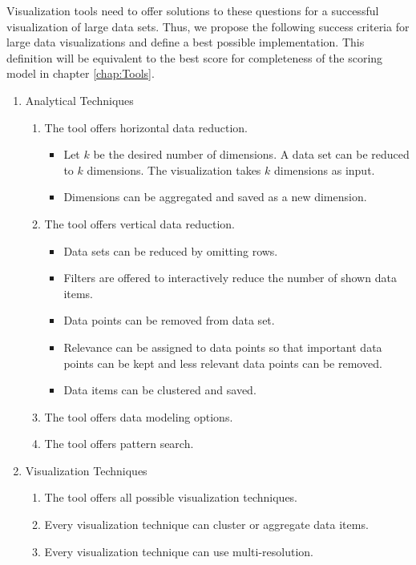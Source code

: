 Visualization tools need to offer solutions to these questions for a successful visualization of large data sets. Thus, we propose the following success criteria for large data visualizations and define a best possible implementation. This definition will be equivalent to the best score for completeness of the scoring model in chapter \ref{chap:Tools}.
\begin{enumerate} [noitemsep]
\item Analytical Techniques 
\begin{enumerate}
    \item The tool offers horizontal data reduction.
    \begin{itemize}
        \item Let $k$ be the desired number of dimensions. A data set can be reduced to $k$ dimensions. The visualization takes $k$ dimensions as input.
        \item Dimensions can be aggregated and saved as a new dimension.
    \end{itemize}
    \item The tool offers vertical data reduction.
    \begin{itemize}
        \item Data sets can be reduced by omitting rows.
        \item Filters are offered to interactively reduce the number of shown data items.
        \item Data points can be removed from data set. 
        \item Relevance can be assigned to data points so that important data points can be kept and less relevant data points can be removed.
        \item Data items can be clustered and saved.  
    \end{itemize}
    \item The tool offers data modeling options.
    \item The tool offers pattern search.
\end{enumerate}


\item Visualization Techniques
\begin{enumerate}
\item The tool offers all possible visualization techniques.
\item Every visualization technique can cluster or aggregate data items.
\item Every visualization technique can use multi-resolution.
\end{enumerate}


\end{enumerate}
